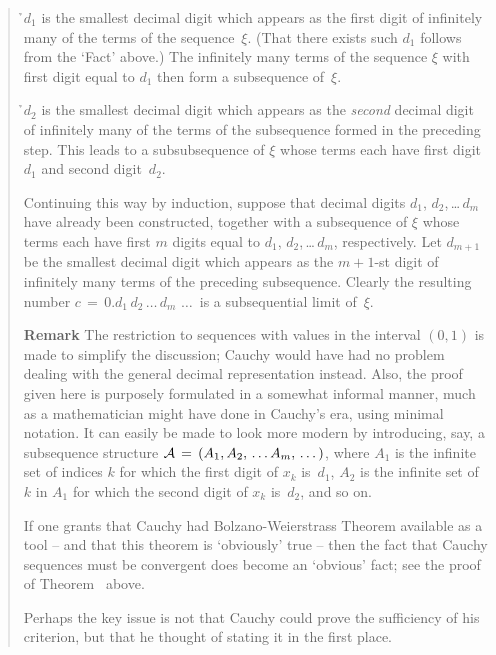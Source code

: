 \begin{quotation}
{        \h $d_{1}$ is the smallest decimal digit which appears as the first digit of infinitely many of the terms of the sequence~${\xi}$.
    (That there exists such $d_{1}$ follows from the `Fact' above.)
    The infinitely many terms of the sequence ${\xi}$ with first digit equal to $d_{1}$ then form a subsequence of~${\xi}$.

        \h $d_{2}$ is the smallest decimal digit which appears as the {\em second}
    decimal digit of infinitely many of the terms of the subsequence formed in the preceding step.
    This leads to a subsubsequence of ${\xi}$ whose terms each have first digit $d_{1}$ and second digit~$d_{2}$.

        Continuing this way by induction, suppose that decimal digits $d_{1}$, $d_{2}$,\,{\ldots}\,$d_{m}$
    have already been constructed, together with a subsequence of ${\xi}$ whose terms
    each have first $m$ digits equal to $d_{1}$, $d_{2}$,\,{\ldots}\,$d_{m}$, respectively.
    Let $d_{m+1}$ be the smallest decimal digit which appears as the $m+1$-st digit of infinitely many terms of the preceding subsequence.
    Clearly the resulting number  $c \,=\, 0.d_{1}\,d_{2}\,{\ldots}\,d_{m}\,\,{\ldots}\,$
    is a subsequential limit of~${\xi}$.

\V

        {\bf Remark} The restriction to sequences with values in the interval $(0,1)$ is made to simplify the discussion;
    Cauchy would have had no problem dealing with the general decimal representation instead.
    Also, the proof given here is purposely formulated in a somewhat informal manner, much as a mathematician might have done in Cauchy's era,
    using minimal notation. It can easily be made to look more modern by introducing, say, a subsequence structure ${\cal A} \,=\, (A_{1},A_{2},\,{\ldots}\,A_{m},\,{\ldots}\,)$,
    where $A_{1}$ is the infinite set of indices $k$ for which the first digit of $x_{k}$ is~$d_{1}$,
    $A_{2}$ is the infinite set of $k$ in $A_{1}$ for which the second digit of $x_{k}$ is~$d_{2}$, and so on.

\VV

        If one grants that Cauchy had Bolzano-Weierstrass Theorem available as a tool -- and that this theorem is `obviously' true --
    then the fact that Cauchy sequences must be convergent does become an `obvious' fact; see the proof of Theorem~ above.


        Perhaps the key issue is not that Cauchy could prove the sufficiency of his criterion, but that he thought of stating it in the first place.


}
\end{quotation}
